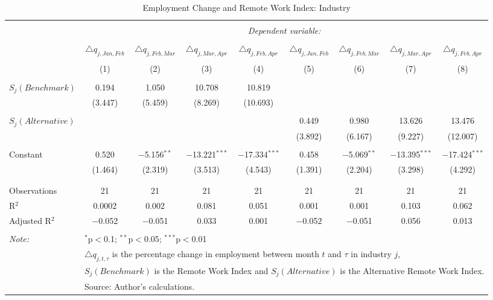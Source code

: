 
\begin{table}[!htbp] \centering 
  \caption{Employment Change and Remote Work Index: Industry} 
  \label{tab:regression_dynamics_industry} 
\footnotesize 
\begin{tabular}{@{\extracolsep{5pt}}lcccccccc} 
\\[-1.8ex]\hline 
\hline \\[-1.8ex] 
 & \multicolumn{8}{c}{\textit{Dependent variable:}} \\ 
\cline{2-9} 
\\[-1.8ex] & $\triangle q_{j,Jan,Feb}$ & $\triangle q_{j,Feb,Mar}$ & $\triangle q_{j,Mar,Apr}$ & $\triangle q_{j,Feb,Apr}$ & $\triangle q_{j,Jan,Feb}$ & $\triangle q_{j,Feb,Mar}$ & $\triangle q_{j,Mar,Apr}$ & $\triangle q_{j,Feb,Apr}$ \\ 
\\[-1.8ex] & (1) & (2) & (3) & (4) & (5) & (6) & (7) & (8)\\ 
\hline \\[-1.8ex] 
 $S_{j}(Benchmark)$ & 0.194 & 1.050 & 10.708 & 10.819 &  &  &  &  \\ 
  & (3.447) & (5.459) & (8.269) & (10.693) &  &  &  &  \\ 
  & & & & & & & & \\ 
 $S_{j}(Alternative)$ &  &  &  &  & 0.449 & 0.980 & 13.626 & 13.476 \\ 
  &  &  &  &  & (3.892) & (6.167) & (9.227) & (12.007) \\ 
  & & & & & & & & \\ 
 Constant & 0.520 & $-$5.156$^{**}$ & $-$13.221$^{***}$ & $-$17.334$^{***}$ & 0.458 & $-$5.069$^{**}$ & $-$13.395$^{***}$ & $-$17.424$^{***}$ \\ 
  & (1.464) & (2.319) & (3.513) & (4.543) & (1.391) & (2.204) & (3.298) & (4.292) \\ 
  & & & & & & & & \\ 
\hline \\[-1.8ex] 
Observations & 21 & 21 & 21 & 21 & 21 & 21 & 21 & 21 \\ 
R$^{2}$ & 0.0002 & 0.002 & 0.081 & 0.051 & 0.001 & 0.001 & 0.103 & 0.062 \\ 
Adjusted R$^{2}$ & $-$0.052 & $-$0.051 & 0.033 & 0.001 & $-$0.052 & $-$0.051 & 0.056 & 0.013 \\ 
\hline 
\hline \\[-1.8ex] 
\textit{Note:}  & \multicolumn{8}{l}{$^{*}$p$<$0.1; $^{**}$p$<$0.05; $^{***}$p$<$0.01} \\ 
 & \multicolumn{8}{l}{$\triangle q_{j,t,\tau}$ is the percentage change in employment between month $t$ and $\tau$ in industry $j$,} \\ 
 & \multicolumn{8}{l}{$S_{j} (Benchmark)$ is the Remote Work Index and $S_{j} (Alternative)$ is the Alternative Remote Work Index.} \\ 
 & \multicolumn{8}{l}{Source: Author's calculations.} \\ 
\end{tabular} 
\end{table} 
